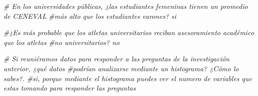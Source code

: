 \documentclass[
]{article}
\newenvironment{Shaded}{\begin{snugshade}}{\end{snugshade}}
\newcommand{\CommentTok}[1]{\textcolor[rgb]{0.56,0.35,0.01}{\textit{#1}}}
\begin{document}
\begin{Shaded}
\begin{Highlighting}[]
 \CommentTok{\# En los universidades públicas, ¿las estudiantes femeninas tienen un promedio de CENEVAL}
\CommentTok{\#más alto que los estudiantes varones? si}

  \CommentTok{\#¿Es más probable que los atletas universitarios reciban asesoramiento académico que los atletas}
\CommentTok{\#no universitarios? no}

 \CommentTok{\# Si reuniéramos datos para responder a las preguntas de la investigación anterior, ¿qué datos}
\CommentTok{\#podrían analizarse mediante un histograma? ¿Cómo lo sabes?.}
\CommentTok{\#si, porque mediante el histograma puedes ver el numero de variables que estas tomando para responder las preguntas}
\end{Highlighting}
\end{Shaded}
\end{document}

